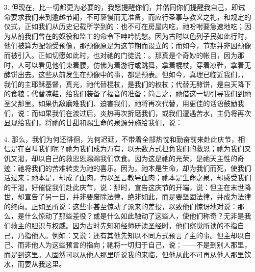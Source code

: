 3. 但现在，比一切都更为必要的，我愿提醒你们，并偕同你们提醒我自己，即诫命要求我们来到逾越节期，不可亵慢而无准备，而应行圣事与教义之礼，和规定的仪式，正如我们从历史记载所学到的：也不可在房屋内吃，祂吩咐要急速地吃；因为从前我们曾在的奴役和监工的命令下呻吟忧愁。因为古时以色列子民如此行时，他们被算为配领受预像，那预像原是为这节期而设立的；而如今，节期并非因预像而被引入。正如切愿如此时，也对祂的门徒说：。那真是个奇妙的帐目，因为那时，人可以看见他们束着腰，仿佛为着游行或跳舞，拿着棍杖，穿着凉鞋，拿着无酵饼出去。这些从前发生在预像中的事，都是预表。但如今，真理已临近我们，，我们的主耶稣基督，真光，祂代替棍杖，是我们的权杖；代替无酵饼，是自天降下的食粮；代替凉鞋，给我们装备了福音的准备；简言之，祂借这一切引导我们到祂圣父那里。如果仇敌磨难我们、迫害我们，祂将再次代替，用更佳的话语鼓励我们，说：而如果我们在渡过后，炎热再次折磨我们，或我们遭遇苦水，主仍将再次显现给我们，将祂的甘甜和赐生命的泉源分施给我们，说：\par

4. 那么，我们为何还徘徊，为何迟延，不带着全部热忱和勤奋前来赴此庆节，相信是在召叫我们呢？祂为我们成为万有，以无数方式担负我们的救恩；祂为我们又饥又渴，却以自己的救恩恩赐赐我们饮食。因为这是祂的光荣，是祂天主性的奇迹：祂将我们的苦难转变为祂的喜乐。因为，祂本是生命，却为我们而死，使我们活过来；祂本是，却成了血肉，为以圣言教导血肉；祂本是生命之泉，却感受我们的干渴，好催促我们赴此庆节，说：那时，宣告这庆节的开端，说：但主在末世降世，却宣告了另一日，并非要废除法律，绝非如此，而是要坚固法律，并成为法律的终向。正如圣所说：这些事甚至惊动了派来的差役，以致他们惊讶地对说：那么，是什么惊动了那些差役？或是什么如此触动了这些人，使他们称奇？无非是我们救主的胆识与权威。因为古时先知和经师研读圣经时，他们察觉所读的不指自己，乃指他人。例如：又说：还有其他先知以不同方式预言了主的事。但主却以自己、而非他人为这些预言的指向；祂将一切归于自己，说：——不是到别人那里，而是到这里。人固然可以从他人那里听说我的来临，但他从此不可再从他人那里饮水，而要从我这里。\par

